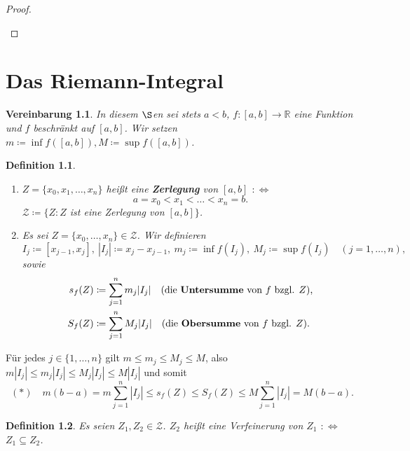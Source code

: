 \documentclass[12pt]{extreport} %
\newcommand{\R}{\mathbb{R}}
\theoremstyle{named}
\theoremstyle{itshape}
\newtheorem*{definition}{Definition}
\theoremstyle{normal}
\newtheorem*{vereinbarung}{Vereinbarung}
\begin{document}
{\begin{proof}
\begin{enumerate}
	\end{enumerate}
\end{proof}


\newpage


\chapter{Das Riemann-Integral}

\begin{vereinbarung}
In diesem $\S$en sei stets $a < b$, $f \colon [a, b] \rightarrow \R$ eine Funktion und $f$ beschränkt auf $[a, b]$. Wir setzen 
$m \coloneqq \inf f([a, b]), M \coloneqq \sup f([a, b])$.
\end{vereinbarung}

\begin{definition} ~\
\begin{enumerate}
 \item $Z = \{ x_{0}, x_{1}, \dotsc, x_{n} \}$ hei{\ss}t eine \textbf{Zerlegung} von $[a, b]$ $:\iff$ 
       $$a = x_{0} < x_{1} < \dotsc < x_{n} = b.$$ 
       $\mathcal{Z} \coloneqq \{ Z: Z$ ist eine Zerlegung von $[a, b] \}$. 

 \item Es sei $Z = \{ x_{0}, \dotsc, x_{n} \} \in \mathcal{Z}$. Wir definieren 
      $$I_{j} \coloneqq [x_{j-1} , x_{j}], ~ |I_{j}| \coloneqq x_{j} - x_{j-1}, ~ m_{j} \coloneqq \inf f(I_{j}), ~ M_{j} \coloneqq \sup f(I_{j})  \quad (j = 1, \dotsc, n),$$
      sowie
	\begin{align*}
		s_{f}(Z) & \coloneqq \sum_{j=1}^{n} m_{j} |I_{j}| \quad \text{(die \textbf{Untersumme} von $f$ bzgl. $Z$),} \\
		S_{f}(Z) & \coloneqq \sum_{j=1}^{n} M_{j} |I_{j}| \quad \text{(die \textbf{Obersumme} von $f$ bzgl. $Z$).}
	\end{align*}
\end{enumerate}
\end{definition}	

Für jedes $j \in\{1, \dotsc, n\}$ gilt $m \leq m_{j} \leq M_{j} \leq M$, also $m |I_{j}| \leq m_{j} |I_{j}| \leq M_{j} |I_{j}| \leq M |I_{j}|$ und somit
	$$
	(\ast) \quad m(b-a)= m\sum_{j=1}^{n} |I_{j}| \leq s_{f}(Z) \leq S_{f}(Z) \leq M \sum_{j=1}^{n} |I_{j}| = M (b - a). 
	$$
	



\begin{definition}
	Es seien $Z_{1}, Z_{2} \in \mathcal{Z}$. $Z_{2}$ hei{\ss}t eine Verfeinerung von $Z_{1}$ $:\iff$ $Z_{1} \subseteq Z_{2}$.
\end{definition}


}
\end{document}
